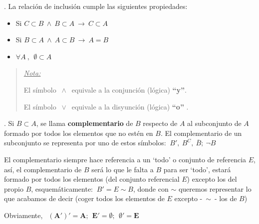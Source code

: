 \begin{theorem}
	. La relación de inclusión cumple las siguientes propiedades:
	
	\begin{itemize}
	\vspace{-3mm} \item Si $C\subset B \ \wedge \ B \subset A \ \to \ C \subset A$
    \vspace{-3mm} \item Si $B \subset A \ \wedge \ A \subset B \ \to \ A=B$
	\vspace{-3mm} \item $\forall A \ , \ \ \emptyset \subset A$
	\end{itemize}
	
	\begin{scriptsize}
	\begin{quotation}
		\textcolor{gris}{ \emph{\underline{Nota:}}}
		
		\textcolor{gris}{El símbolo $\ \wedge \ $ equivale a la conjunción (lógica) \textbf{``y''}}. 
		
		\textcolor{gris}{El símbolo $\ \vee \ $ equivale a la disyunción (lógica) \textbf{``o''} .}
	\end{quotation}
	\end{scriptsize}
	
\end{theorem}

\begin{definition}
	. Si $B\subset A$, se llama \textbf{complementario} de $B$ respecto de $A$ al subconjunto de $A$ formado por todos los elementos que no estén en $B$.
	El complementario de un subconjunto se representa por uno de estos símbolos: $\ B',\ B^C,\ \overline{B};\  \neg B$	
	
	
	\small{El complementario siempre hace referencia a un `todo' o conjunto de referencia $E$, así, el complementario de $B$ será lo que le falta a $B$ para ser `todo', estará formado por todos los elementos (del conjunto referencial $E$) excepto los del propio $B$, esquemáticamente: $\ B'=E\sim B$, donde con $\sim$ queremos representar lo que acabamos de decir \textcolor{gris}{(coger todos los elementos de $E$ excepto -$\ \sim \ $- los de $B$)}}
	
	Obviamente, $\ \boxed{ \boldsymbol{ \ (A')'=A;\ \ E'=\emptyset; \ \ \emptyset'=E \ }}$
\end{definition}


